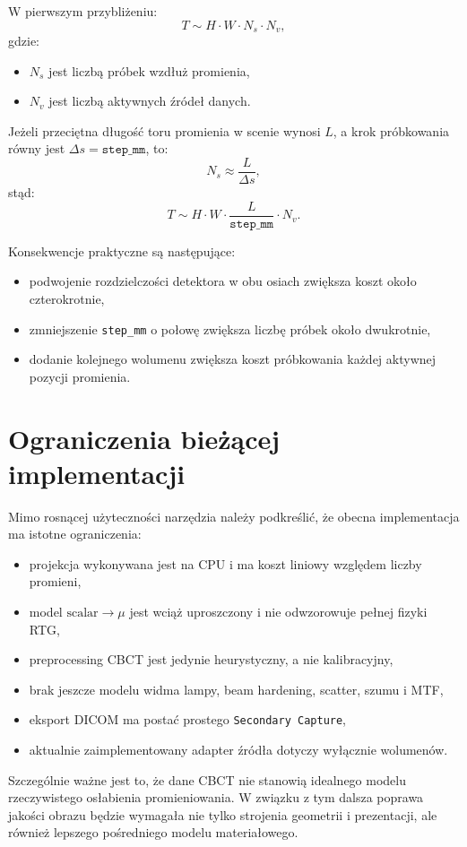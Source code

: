 \documentclass[12pt,a4paper]{article}
\begin{document}
W pierwszym przybliżeniu:
\[
  T \sim H \cdot W \cdot N_s \cdot N_v,
\]
gdzie:
\begin{itemize}
  \item \(N_s\) jest liczbą próbek wzdłuż promienia,
  \item \(N_v\) jest liczbą aktywnych źródeł danych.
\end{itemize}

Jeżeli przeciętna długość toru promienia w scenie wynosi \(L\), a krok
próbkowania równy jest \(\Delta s = \texttt{step\_mm}\), to:
\[
  N_s \approx \frac{L}{\Delta s},
\]
stąd:
\[
  T \sim H \cdot W \cdot \frac{L}{\texttt{step\_mm}} \cdot N_v.
\]

Konsekwencje praktyczne są następujące:
\begin{itemize}
  \item podwojenie rozdzielczości detektora w obu osiach zwiększa koszt około czterokrotnie,
  \item zmniejszenie \texttt{step\_mm} o połowę zwiększa liczbę próbek około dwukrotnie,
  \item dodanie kolejnego wolumenu zwiększa koszt próbkowania każdej aktywnej pozycji promienia.
\end{itemize}

\section{Ograniczenia bieżącej implementacji}

Mimo rosnącej użyteczności narzędzia należy podkreślić, że obecna implementacja
ma istotne ograniczenia:
\begin{itemize}
  \item projekcja wykonywana jest na CPU i ma koszt liniowy względem liczby promieni,
  \item model \(\mathrm{scalar}\to\mu\) jest wciąż uproszczony i nie odwzorowuje pełnej fizyki RTG,
  \item preprocessing CBCT jest jedynie heurystyczny, a nie kalibracyjny,
  \item brak jeszcze modelu widma lampy, beam hardening, scatter, szumu i MTF,
  \item eksport DICOM ma postać prostego \texttt{Secondary Capture},
  \item aktualnie zaimplementowany adapter źródła dotyczy wyłącznie wolumenów.
\end{itemize}

Szczególnie ważne jest to, że dane CBCT nie stanowią idealnego modelu rzeczywistego
osłabienia promieniowania. W związku z tym dalsza poprawa jakości obrazu będzie
wymagała nie tylko strojenia geometrii i prezentacji, ale również lepszego
pośredniego modelu materiałowego.
\end{document}
